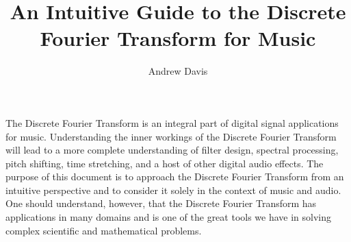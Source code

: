 \documentclass{article}
\title{An Intuitive Guide to the Discrete Fourier Transform for Music}
\author{Andrew Davis}
\begin{document}
	\maketitle
	
	The Discrete Fourier Transform is an integral part of digital signal applications for music.  Understanding the
	inner workings of the Discrete Fourier Transform  will lead to a more complete understanding of filter
	design, spectral processing, pitch shifting, time stretching, and a host of other digital audio effects.  The 
	purpose of this document is to approach the Discrete Fourier Transform from an intuitive perspective and to
	consider it solely in the context of music and audio.  One should understand, however, that the Discrete 
	Fourier Transform 
	has applications in many domains and is one of the great tools we have in solving complex scientific and 
	mathematical problems.  
	
	
	
	
	
	
	
	
	\newpage
\end{document}

